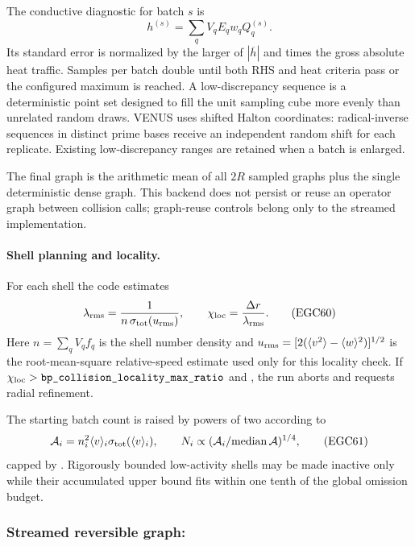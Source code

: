 The conductive diagnostic for batch \(s\) is
\[
 h^{(s)}=\sum_qV_qE_qw_qQ_q^{(s)}.                       \tag{EGC59}
\]
Its standard error is normalized by the larger of
\(|\overline h|\) and
 times the gross absolute heat traffic.
Samples per batch double until both RHS and heat criteria pass or the
configured maximum is reached.  A low-discrepancy sequence is a deterministic
point set designed to fill the unit sampling cube more evenly than unrelated
random draws.  VENUS uses shifted Halton coordinates: radical-inverse
sequences in distinct prime bases receive an independent random shift for
each replicate.  Existing low-discrepancy ranges are retained when a batch is
enlarged.

The final graph is the arithmetic mean of all \(2R\) sampled graphs plus the
single deterministic dense graph.  This backend does not persist or reuse an
operator graph between collision calls; graph-reuse controls belong only to
the streamed implementation.

\paragraph{Shell planning and locality.}
For each shell the code estimates
\[
 \lambda_{\rm rms}=
 \frac{1}{n\,\sigma_{\rm tot}(u_{\rm rms})},\qquad
 \chi_{\rm loc}=\frac{\Delta r}{\lambda_{\rm rms}}.       \tag{EGC60}
\]
Here \(n=\sum_qV_qf_q\) is the shell number density and
\(u_{\rm rms}=[2(\langle v^2\rangle-\langle w\rangle^2)]^{1/2}\) is the
root-mean-square relative-speed estimate used only for this locality check.
If \(\chi_{\rm loc}>\code{bp_collision_locality_max_ratio}\) and
, the run aborts and requests
radial refinement.

The starting batch count is raised by powers of two according to
\[
 {\cal A}_i=n_i^2\langle v\rangle_i
 \sigma_{\rm tot}(\langle v\rangle_i),\qquad
 N_i\propto({\cal A}_i/{\rm median}\,{\cal A})^{1/4},     \tag{EGC61}
\]
capped by .  Rigorously bounded
low-activity shells may be made inactive only while their accumulated upper
bound fits within one tenth of the global omission budget.

\subsubsection[Streamed reversible graph]{
Streamed reversible graph:
}

